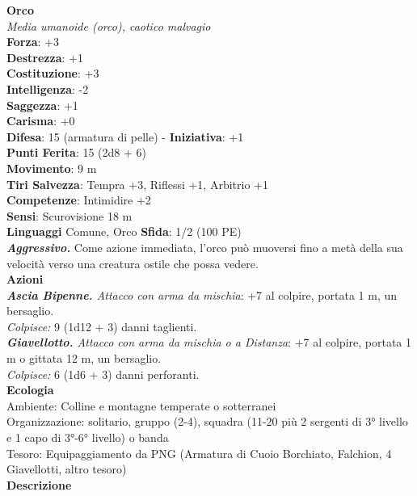 \begin{multicols}{2}
\medskip\textbf{Orco}\\
\emph{Media umanoide (orco), caotico malvagio}\\
\textbf{Forza}: +3\\
\textbf{Destrezza}: +1\\
\textbf{Costituzione}: +3\\
\textbf{Intelligenza}: -2\\
\textbf{Saggezza}: +1\\
\textbf{Carisma}: +0\\
\textbf{Difesa}: 15 (armatura di pelle) - \textbf{Iniziativa}: +1\\
\textbf{Punti Ferita}: 15 (2d8 + 6)\\
\textbf{Movimento}: 9 m\\
\textbf{Tiri Salvezza}: Tempra +3, Riflessi +1, Arbitrio +1\\
\textbf{Competenze}: Intimidire +2\\
\textbf{Sensi}: Scurovisione 18 m\\
\textbf{Linguaggi} Comune, Orco \textbf{Sfida}: 1/2 (100 PE)\smallskip\\
\emph{\textbf{Aggressivo.}} Come azione immediata, l'orco può muoversi fino a metà della sua velocità verso una creatura ostile che possa vedere. \\
\smallskip\textbf{Azioni}\\
\emph{\textbf{Ascia Bipenne.} Attacco con arma da mischia}: +7 al colpire, portata 1 m, un bersaglio.\\
\emph{Colpisce:} 9 (1d12 + 3) danni taglienti.\\
\emph{\textbf{Giavellotto.} Attacco con arma da mischia o a Distanza}: +7 al colpire, portata 1 m o gittata 12 m, un bersaglio. \\
\emph{Colpisce:} 6 (1d6 + 3) danni perforanti.\\
\textbf{Ecologia}\\
Ambiente: Colline e montagne temperate o sotterranei\\
Organizzazione: solitario, gruppo (2-4), squadra (11-20 più 2 sergenti di 3° livello e 1 capo di 3°-6° livello) o banda \\
Tesoro: Equipaggiamento da PNG (Armatura di Cuoio Borchiato, Falchion, 4 Giavellotti, altro tesoro)\\
\textbf{Descrizione}\\

\end{multicols}
